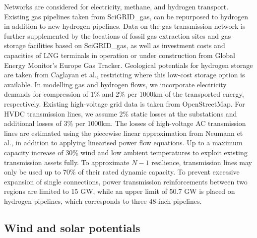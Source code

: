 Networks are considered for electricity, methane, and hydrogen transport.
Existing gas pipelines taken from SciGRID\_gas,\cite{plutaSciGRIDGas2022a} can
be repurposed to hydrogen in addition to new hydrogen
pipelines.\cite{neumannPotentialRoleHydrogen2023} Data on the gas transmission
network is further supplemented by the locations of fossil gas extraction sites
and gas storage facilities based on SciGRID\_gas,\cite{plutaSciGRIDGas2022a} as
well as investment costs and capacities of LNG terminals in operation or under
construction from Global Energy Monitor's Europe Gas
Tracker.\cite{globalenergymonitorEuropeGasTracker2024} Geological potentials for
hydrogen storage are taken from Caglayan et
al.,\cite{caglayanTechnicalPotentialSalt2020} restricting where this low-cost
storage option is available. In modelling gas and hydrogen flows, we incorporate
electricity demands for compression of 1\% and 2\% per 1000km of the transported
energy, respectively.\cite{gasforclimateEuropeanHydrogen2021} Existing
high-voltage grid data is taken from
OpenStreetMap.\cite{xiongModellingHighVoltageGrid2024} For HVDC transmission
lines, we assume 2\% static losses at the substations and additional losses of
3\% per 1000km. The losses of high-voltage AC transmission lines are estimated
using the piecewise linear approximation from Neumann et
al.,\cite{neumannAssessmentsLinear2022} in addition to applying linearised power
flow equations.\cite{horschLinearOptimal2018} Up to a maximum capacity increase
of 30\%
wind and low ambient temperatures to exploit existing transmission assets
fully.\cite{glaumLeveragingExisting2023} To approximate $N-1$ resilience,
transmission lines may only be used up to 70\% of their rated dynamic
capacity.\cite{shokrigazafroudiTopologybasedApproximations12022} To prevent
excessive expansion of single connections, power transmission reinforcements
between two regions are limited to 15 GW, while an upper limit of 50.7 GW is
placed on hydrogen pipelines, which corresponds to three 48-inch
pipelines.\cite{gasforclimateEuropeanHydrogen2021}

\subsection*{Wind and solar potentials}

